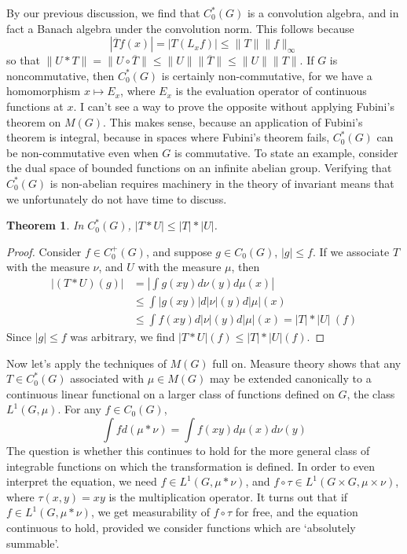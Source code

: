 \documentclass{article}
\theoremstyle{plain}
\newtheorem{theorem}{Theorem}
\theoremstyle{definition}
\begin{document}
By our previous discussion, we find that $C^*_0(G)$ is a convolution algebra, and in fact a Banach algebra under the convolution norm. This follows because
%
\[ |\overline{T}f(x)| = |T(L_x f)| \leq \| T \| \| f \|_\infty \]
%
so that $\| U * T \| = \| U \circ \overline{T} \| \leq \| U \| \| \overline{T} \| \leq \| U \| \| T \|$. If $G$ is noncommutative, then $C^*_0(G)$ is certainly non-commutative, for we have a homomorphism $x \mapsto E_x$, where $E_x$ is the evaluation operator of continuous functions at $x$. I can't see a way to prove the opposite without applying Fubini's theorem on $M(G)$. This makes sense, because an application of Fubini's theorem is integral, because in spaces where Fubini's theorem fails, $C^*_0(G)$ can be non-commutative even when $G$ is commutative. To state an example, consider the dual space of bounded functions on an infinite abelian group. Verifying that $C^*_0(G)$ is non-abelian requires machinery in the theory of invariant means that we unfortunately do not have time to discuss.

\begin{theorem}
    In $C_0^*(G)$, $|T * U| \leq |T| * |U|$.
\end{theorem}
\begin{proof}
    Consider $f \in C_0^+(G)$, and suppose $g \in C_0(G)$, $|g| \leq f$. If we associate $T$ with the measure $\nu$, and $U$ with the measure $\mu$, then
    \begin{align*}
        |(T * U)(g)| &= \left| \int g(xy) d\nu(y) d\mu(x) \right|\\
        &\leq \int |g(xy)| d|\nu|(y) d|\mu|(x)\\
        &\leq \int f(xy) d|\nu|(y) d|\mu|(x) = |T| * |U|\ (f)
    \end{align*}
    Since $|g| \leq f$ was arbitrary, we find $|T * U|(f) \leq |T| * |U| (f)$.
\end{proof}

Now let's apply the techniques of $M(G)$ full on. Measure theory shows that any $T \in C_0^*(G)$ associated with $\mu \in M(G)$ may be extended canonically to a continuous linear functional on a larger class of functions defined on $G$, the class $L^1(G, \mu)$. For any $f \in C_0(G)$,
%
\[ \int f d(\mu * \nu) = \int f(xy) d\mu(x) d\nu(y) \]
%
The question is whether this continues to hold for the more general class of integrable functions on which the transformation is defined. In order to even interpret the equation, we need $f \in L^1(G, \mu * \nu)$, and $f \circ \tau \in L^1(G \times G, \mu \times \nu)$, where $\tau(x,y) = xy$ is the multiplication operator. It turns out that if $f \in L^1(G, \mu * \nu)$, we get measurability of $f \circ \tau$ for free, and the equation continuous to hold, provided we consider functions which are `absolutely summable'.
\end{document}
